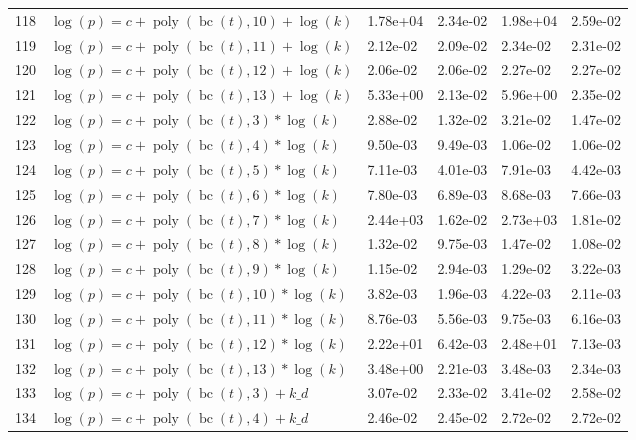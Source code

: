 \documentclass[12pt,a4paper]{article}
\DeclareMathOperator{\bc}{bc}
\DeclareMathOperator{\poly}{poly}
\begin{document}
\begin{longtable}[t]{ll>{\raggedleft\arraybackslash}p{2cm}>{\raggedleft\arraybackslash}p{2cm}>{\raggedleft\arraybackslash}p{2cm}>{\raggedleft\arraybackslash}p{2cm}}
118 & $\log(p) = c + \poly\left( \bc(t), 10 \right) + \log(k)$ & 1.78e+04 & 2.34e-02 & 1.98e+04 & 2.59e-02\\
\rowcolor{gray!6}  119 & $\log(p) = c + \poly\left( \bc(t), 11 \right) + \log(k)$ & 2.12e-02 & 2.09e-02 & 2.34e-02 & 2.31e-02\\
120 & $\log(p) = c + \poly\left( \bc(t), 12 \right) + \log(k)$ & 2.06e-02 & 2.06e-02 & 2.27e-02 & 2.27e-02\\
\rowcolor{gray!6}  121 & $\log(p) = c + \poly\left( \bc(t), 13 \right) + \log(k)$ & 5.33e+00 & 2.13e-02 & 5.96e+00 & 2.35e-02\\
122 & $\log(p) = c + \poly\left( \bc(t), 3 \right) * \log(k)$ & 2.88e-02 & 1.32e-02 & 3.21e-02 & 1.47e-02\\
\rowcolor{gray!6}  123 & $\log(p) = c + \poly\left( \bc(t), 4 \right) * \log(k)$ & 9.50e-03 & 9.49e-03 & 1.06e-02 & 1.06e-02\\
124 & $\log(p) = c + \poly\left( \bc(t), 5 \right) * \log(k)$ & 7.11e-03 & 4.01e-03 & 7.91e-03 & 4.42e-03\\
\rowcolor{gray!6}  125 & $\log(p) = c + \poly\left( \bc(t), 6 \right) * \log(k)$ & 7.80e-03 & 6.89e-03 & 8.68e-03 & 7.66e-03\\
126 & $\log(p) = c + \poly\left( \bc(t), 7 \right) * \log(k)$ & 2.44e+03 & 1.62e-02 & 2.73e+03 & 1.81e-02\\
\rowcolor{gray!6}  127 & $\log(p) = c + \poly\left( \bc(t), 8 \right) * \log(k)$ & 1.32e-02 & 9.75e-03 & 1.47e-02 & 1.08e-02\\
128 & $\log(p) = c + \poly\left( \bc(t), 9 \right) * \log(k)$ & 1.15e-02 & 2.94e-03 & 1.29e-02 & 3.22e-03\\
\rowcolor{gray!6}  129 & $\log(p) = c + \poly\left( \bc(t), 10 \right) * \log(k)$ & 3.82e-03 & 1.96e-03 & 4.22e-03 & 2.11e-03\\
130 & $\log(p) = c + \poly\left( \bc(t), 11 \right) * \log(k)$ & 8.76e-03 & 5.56e-03 & 9.75e-03 & 6.16e-03\\
\rowcolor{gray!6}  131 & $\log(p) = c + \poly\left( \bc(t), 12 \right) * \log(k)$ & 2.22e+01 & 6.42e-03 & 2.48e+01 & 7.13e-03\\
132 & $\log(p) = c + \poly\left( \bc(t), 13 \right) * \log(k)$ & 3.48e+00 & 2.21e-03 & 3.48e-03 & 2.34e-03\\
\rowcolor{gray!6}  133 & $\log(p) = c + \poly\left( \bc(t), 3 \right) + k\_d$ & 3.07e-02 & 2.33e-02 & 3.41e-02 & 2.58e-02\\
134 & $\log(p) = c + \poly\left( \bc(t), 4 \right) + k\_d$ & 2.46e-02 & 2.45e-02 & 2.72e-02 & 2.72e-02\\

\end{longtable}
\end{document}
